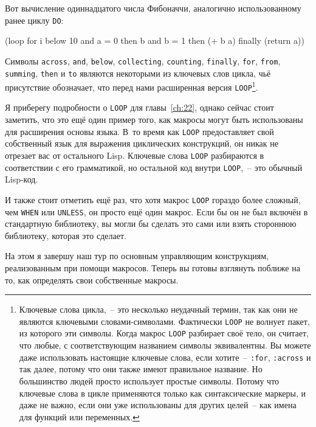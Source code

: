 Вот вычисление одиннадцатого числа Фибоначчи, аналогично использованному ранее циклу \lstinline{DO}:

\begin{myverb}
(loop for i below 10
      and a = 0 then b
      and b = 1 then (+ b a)
      finally (return  a))
\end{myverb}

Символы \lstinline{across}, \lstinline{and}, \lstinline{below}, \lstinline{collecting}, \lstinline{counting},
\lstinline{finally}, \lstinline{for}, \lstinline{from}, \lstinline{summing}, \lstinline{then} и \lstinline{to} являются
некоторыми из ключевых слов цикла, чьё присутствие обозначает, что перед нами расширенная
версия \lstinline{LOOP}\footnote{Ключевые слова цикла,~-- это несколько неудачный термин, так
  как они не являются ключевыми словами-символами. Фактически \lstinline{LOOP} не волнует
  пакет, из которого эти символы. Когда макрос \lstinline{LOOP} разбирает своё тело, он
  считает, что любые, с соответствующим названием символы эквивалентны. Вы можете даже
  использовать настоящие ключевые слова, если хотите~-- \lstinline{:for}, \lstinline{:across} и так
  далее, потому что они также имеют правильное название. Но большинство людей просто
  использует простые символы. Потому что ключевые слова в цикле применяются только как
  синтаксические маркеры, и даже не важно, если они уже использованы для других целей~--
  как имена для функций или переменных.}\hspace{\footnotenegspace}.

Я приберегу подробности о \lstinline{LOOP} для главы~\ref{ch:22}, однако сейчас стоит заметить,
что это ещё один пример того, как макросы могут быть использованы для расширения основы
языка. В~то время как \lstinline{LOOP} предоставляет свой собственный язык для выражения
циклических конструкций, он никак не отрезает вас от остального Lisp. Ключевые слова
\lstinline{LOOP} разбираются в соответствии с его грамматикой, но остальной код внутри
\lstinline{LOOP},~-- это обычный Lisp-код.

И также стоит отметить ещё раз, что хотя макрос \lstinline{LOOP} гораздо более сложный, чем
\lstinline{WHEN} или \lstinline{UNLESS}, он просто ещё один макрос. Если бы он не был включён в
стандартную библиотеку, вы могли бы сделать это сами или взять стороннюю библиотеку,
которая это сделает.

На этом я завершу наш тур по основным управляющим конструкциям, реализованным при помощи
макросов. Теперь вы готовы взглянуть поближе на то, как определять свои собственные
макросы.

